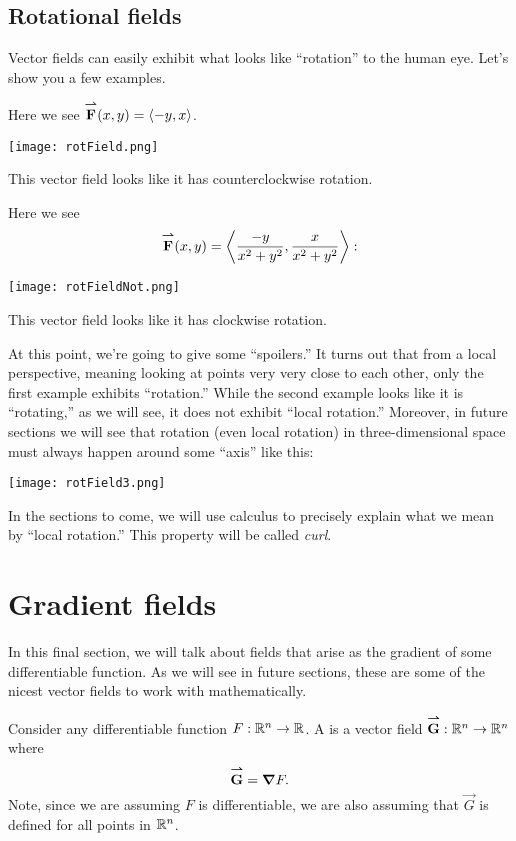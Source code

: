 \documentclass{ximera}
\begin{document}
\subsection{Rotational fields}

Vector fields can easily exhibit what looks like ``rotation'' to the
human eye. Let's show you a few examples.
\begin{example}
  Here we see ${\overset{\boldsymbol{\rightharpoonup}}{\mathbf{F}}}\hspace{0in}(x,y) = \left\langle -y,x\right\rangle$.
  \begin{image}
    \texttt{[image: rotField.png]}
  \end{image}
  This vector field looks like it has counterclockwise rotation.
\end{example}

\begin{example}
  Here we see
  \[
  {\overset{\boldsymbol{\rightharpoonup}}{\mathbf{F}}}\hspace{0in}(x,y) = \left\langle \frac{-y}{x^2+y^2},\frac{x}{x^2+y^2}\right\rangle:
  \]
  \begin{image}
    \texttt{[image: rotFieldNot.png]}
  \end{image}
  This vector field looks like it has clockwise rotation.
\end{example}

At this point, we're going to give some ``spoilers.'' It turns out
that from a local perspective, meaning looking at points very very
close to each other, only the first example exhibits ``rotation.''
While the second example looks like it is ``rotating,'' as we will
see, it does not exhibit ``local rotation.''  Moreover, in future
sections we will see that rotation (even local rotation) in
three-dimensional space must always happen around some ``axis'' like
this:
  \begin{image}
    \texttt{[image: rotField3.png]}
  \end{image}
In the sections to come, we will use calculus to precisely explain
what we mean by ``local rotation.'' This property will be called
\textit{curl}.





\section{Gradient fields}

In this final section, we will talk about fields that arise as the
gradient of some differentiable function.  As we will see in future
sections, these are some of the nicest vector fields to work with
mathematically.


\begin{definition}
  Consider any differentiable function $F:\mathbb R^n\to \mathbb R$.
  A  is a vector field ${\overset{\boldsymbol{\rightharpoonup}}{\mathbf{G}}}\hspace{0in}:\mathbb R^n\to \mathbb R^n$ where
  \[
  {\overset{\boldsymbol{\rightharpoonup}}{\mathbf{G}}}\hspace{0in} = \boldsymbol\nabla F.
  \]
  Note, since we are assuming $F$ is differentiable, we are also
  assuming that $\vec{G}$ is defined for all points in $\mathbb R^n$.
\end{definition}
\end{document}
